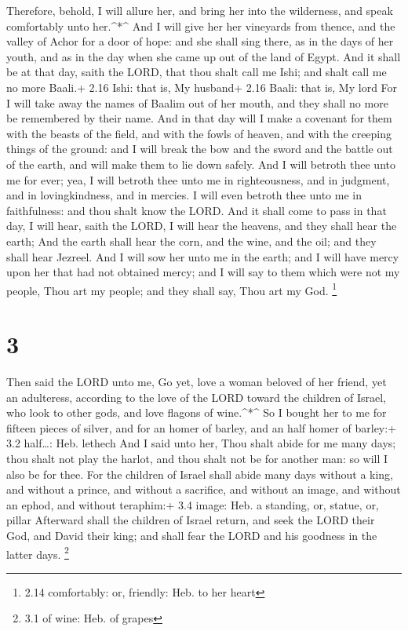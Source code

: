  Therefore, behold, I will allure her, and bring her into
the wilderness, and speak comfortably unto her.\^{}*\^{} 
And I will give her her vineyards from thence, and the valley of Achor
for a door of hope: and she shall sing there, as in the days of her
youth, and as in the day when she came up out of the land of Egypt.
 And it shall be at that day, saith the LORD, that thou
shalt call me Ishi; and shalt call me no more Baali.+ 2.16 Ishi: that
is, My husband+ 2.16 Baali: that is, My lord  For I will
take away the names of Baalim out of her mouth, and they shall no more
be remembered by their name.  And in that day will I make a
covenant for them with the beasts of the field, and with the fowls of
heaven, and with the creeping things of the ground: and I will break the
bow and the sword and the battle out of the earth, and will make them to
lie down safely.  And I will betroth thee unto me for ever;
yea, I will betroth thee unto me in righteousness, and in judgment, and
in lovingkindness, and in mercies.  I will even betroth
thee unto me in faithfulness: and thou shalt know the LORD.
 And it shall come to pass in that day, I will hear, saith
the LORD, I will hear the heavens, and they shall hear the earth;
 And the earth shall hear the corn, and the wine, and the
oil; and they shall hear Jezreel.  And I will sow her unto
me in the earth; and I will have mercy upon her that had not obtained
mercy; and I will say to them which were not my people, Thou art my
people; and they shall say, Thou art my God. \footnote{2.14 comfortably:
  or, friendly: Heb. to her heart}

\hypertarget{section-2}{%
\section{3}\label{section-2}}

 Then said the LORD unto me, Go yet, love a woman beloved of
her friend, yet an adulteress, according to the love of the LORD toward
the children of Israel, who look to other gods, and love flagons of
wine.\^{}*\^{}  So I bought her to me for fifteen pieces of
silver, and for an homer of barley, and an half homer of barley:+ 3.2
half\ldots: Heb. lethech  And I said unto her, Thou shalt
abide for me many days; thou shalt not play the harlot, and thou shalt
not be for another man: so will I also be for thee.  For the
children of Israel shall abide many days without a king, and without a
prince, and without a sacrifice, and without an image, and without an
ephod, and without teraphim:+ 3.4 image: Heb. a standing, or, statue,
or, pillar  Afterward shall the children of Israel return,
and seek the LORD their God, and David their king; and shall fear the
LORD and his goodness in the latter days. \footnote{3.1 of wine: Heb. of
  grapes}

